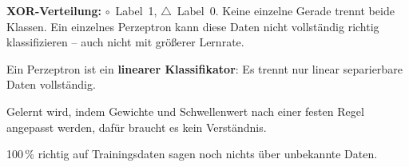 \documentclass[11pt,a4paper]{article}
\newcommand{\fach}[1]{\textbf{\color{navy}#1}}
\begin{document}
\begin{minipage}[c]{0.22\linewidth}
\centering
{}
\end{minipage}\hfill
\begin{minipage}[c]{0.76\linewidth}
\small
\fach{XOR-Verteilung:} {\color{safe}$\circ$}~Label~1, {\color{danger}$\triangle$}~Label~0. Keine einzelne Gerade trennt beide Klassen.
Ein einzelnes Perzeptron kann diese Daten nicht vollständig richtig klassifizieren -- auch nicht mit größerer Lernrate.
\end{minipage}

\begin{merke}
Ein Perzeptron ist ein \fach{linearer Klassifikator}: Es trennt nur linear separierbare Daten vollständig.\par
Gelernt wird, indem Gewichte und Schwellenwert nach einer festen Regel angepasst werden, dafür braucht es kein Verständnis.\par
100\,\% richtig auf Trainingsdaten sagen noch nichts über unbekannte Daten.
\end{merke}
\end{document}
